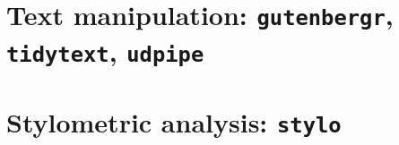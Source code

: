 \documentclass[
]{book}
\begin{document}
\hypertarget{texts}{%
\chapter{\texorpdfstring{Text manipulation: \texttt{gutenbergr}, \texttt{tidytext}, \texttt{udpipe}}{Text manipulation: gutenbergr, tidytext, udpipe}}\label{texts}}

\hypertarget{stylo}{%
\chapter{\texorpdfstring{Stylometric analysis: \texttt{stylo}}{Stylometric analysis: stylo}}\label{stylo}}

\backmatter
  
\end{document}
